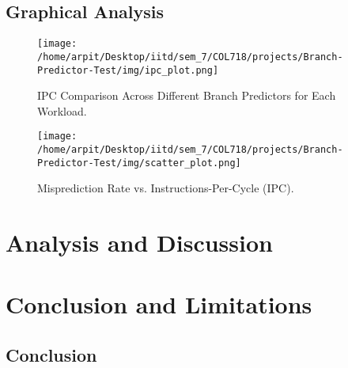 \documentclass[11pt, a4paper]{article}
\begin{document}
\subsection{Graphical Analysis}

\begin{figure}[h!]
    \centering
    \texttt{[image: /home/arpit/Desktop/iitd/sem\_7/COL718/projects/Branch-Predictor-Test/img/ipc\_plot.png]}
    \caption{IPC Comparison Across Different Branch Predictors for Each Workload.}
    \label{fig:ipc_chart}
\end{figure}

\begin{figure}[h!]
    \centering
    \texttt{[image: /home/arpit/Desktop/iitd/sem\_7/COL718/projects/Branch-Predictor-Test/img/scatter\_plot.png]}
    \caption{Misprediction Rate vs. Instructions-Per-Cycle (IPC).}
    \label{fig:scatter_plot}
\end{figure}
\clearpage %

\section{Analysis and Discussion}

\section{Conclusion and Limitations}
\subsection{Conclusion}
\end{document}
